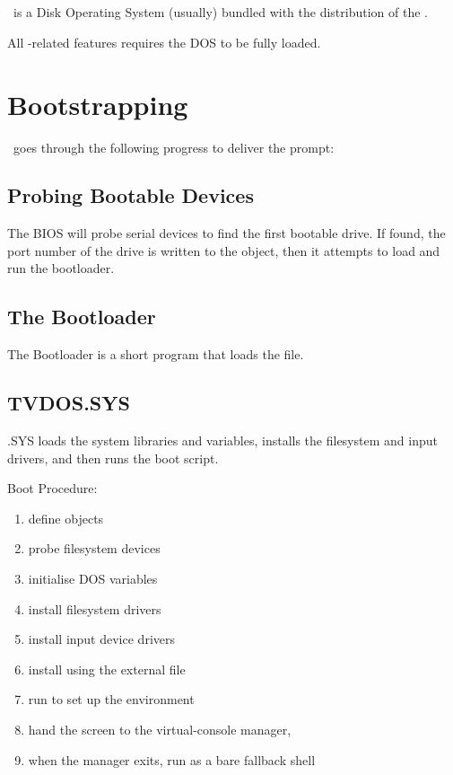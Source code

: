 \chapter{\thedos}

\thedos\ is a Disk Operating System (usually) bundled with the distribution of the \thismachine.

All \thedos-related features requires the DOS to be fully loaded.


\chapter{Bootstrapping}

\thedos\ goes through the following progress to deliver the  prompt:

\section{Probing Bootable Devices}
The BIOS will probe serial devices to find the first bootable drive. If found, the port number of the drive is written to the  object, then it attempts to load and run the bootloader.

\section{The Bootloader}
The Bootloader is a short program that loads the  file.

\section{TVDOS.SYS}
\thedos.SYS loads the system libraries and variables, installs the filesystem and input drivers, and then runs the boot script.

Boot Procedure:

\begin{enumerate}
 \item define  objects
 \item probe filesystem devices
 \item initialise DOS variables
 \item install filesystem drivers
 \item install input device drivers
 \item install  using the external file
 \item run  to set up the environment
 \item hand the screen to the virtual-console manager, 
 \item when the manager exits, run  as a bare fallback shell
\end{enumerate}

